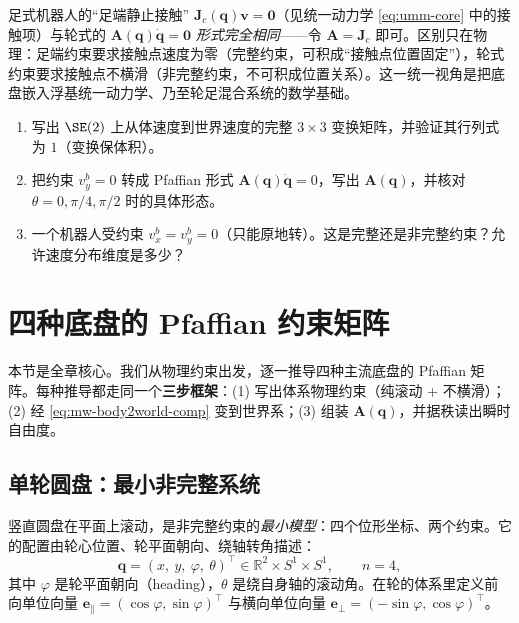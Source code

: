 \begin{insight}[轮式约束与足端接触是同一数学对象]\label{ins:mw-unify}
足式机器人的“足端静止接触” $\mathbf{J}_c(\mathbf{q})\mathbf{v}=\mathbf{0}$（见统一动力学 \cref{eq:umm-core} 中的接触项）与轮式的 $\mathbf{A}(\mathbf{q})\dot{\mathbf{q}}=\mathbf{0}$ \emph{形式完全相同}——令 $\mathbf{A}=\mathbf{J}_c$ 即可。区别只在物理：足端约束要求接触点速度为零（完整约束，可积成“接触点位置固定”），轮式约束要求接触点不横滑（非完整约束，不可积成位置关系）。这一统一视角是把底盘嵌入浮基统一动力学、乃至轮足混合系统的数学基础。
\end{insight}

\begin{practice}
\begin{enumerate}
  \item 写出 $\SE(2)$ 上从体速度到世界速度的完整 $3\times3$ 变换矩阵，并验证其行列式为 $1$（变换保体积）。
  \item 把约束 $v_y^b=0$ 转成 Pfaffian 形式 $\mathbf{A}(\mathbf{q})\dot{\mathbf{q}}=0$，写出 $\mathbf{A}(\mathbf{q})$，并核对 $\theta=0,\pi/4,\pi/2$ 时的具体形态。
  \item 一个机器人受约束 $v_x^b=v_y^b=0$（只能原地转）。这是完整还是非完整约束？允许速度分布维度是多少？
\end{enumerate}
\end{practice}

\section{四种底盘的 Pfaffian 约束矩阵}
\label{sec:mw-pfaffian}

本节是全章核心。我们从物理约束出发，逐一推导四种主流底盘的 Pfaffian 矩阵。每种推导都走同一个\textbf{三步框架}：(1) 写出体系物理约束（纯滚动 + 不横滑）；(2) 经 \cref{eq:mw-body2world-comp} 变到世界系；(3) 组装 $\mathbf{A}(\mathbf{q})$，并据秩读出瞬时自由度。

\subsection{单轮圆盘：最小非完整系统}
\label{sec:mw-disk}

竖直圆盘在平面上滚动，是非完整约束的\emph{最小模型}：四个位形坐标、两个约束。它的配置由轮心位置、轮平面朝向、绕轴转角描述：
\begin{equation}
  \mathbf{q}=(x,\ y,\ \varphi,\ \theta)^\top\in\mathbb{R}^2\times S^1\times S^1,\qquad n=4,
  \label{eq:mw-disk-q}
\end{equation}
其中 $\varphi$ 是轮平面朝向（heading），$\theta$ 是绕自身轴的滚动角。在轮的体系里定义前向单位向量 $\mathbf{e}_\parallel=(\cos\varphi,\sin\varphi)^\top$ 与横向单位向量 $\mathbf{e}_\perp=(-\sin\varphi,\cos\varphi)^\top$。

